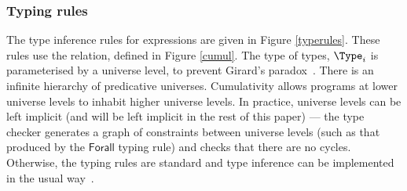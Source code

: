 \subsubsection{Typing rules}

\label{sect:typerules}

The type inference rules for \TT{} expressions are given in Figure
\ref{typerules}.  These rules use the  relation, defined in
Figure \ref{cumul}. The type of types, $\Type_i$ is parameterised by a universe
level, to prevent Girard's paradox~\cite{coquand1986analysis}.  There is an
infinite hierarchy of predicative universes.  Cumulativity allows programs at
lower universe levels to inhabit higher universe levels. In practice, universe levels
can be left implicit (and will be left implicit in the rest of this paper) ---
the type checker generates a graph of constraints between universe levels (such
as that produced by the $\mathsf{Forall}$ typing rule) and checks that there
are no cycles. Otherwise, the typing rules are standard and type inference can
be implemented in the usual way~\cite{loh2010tutorial}.

